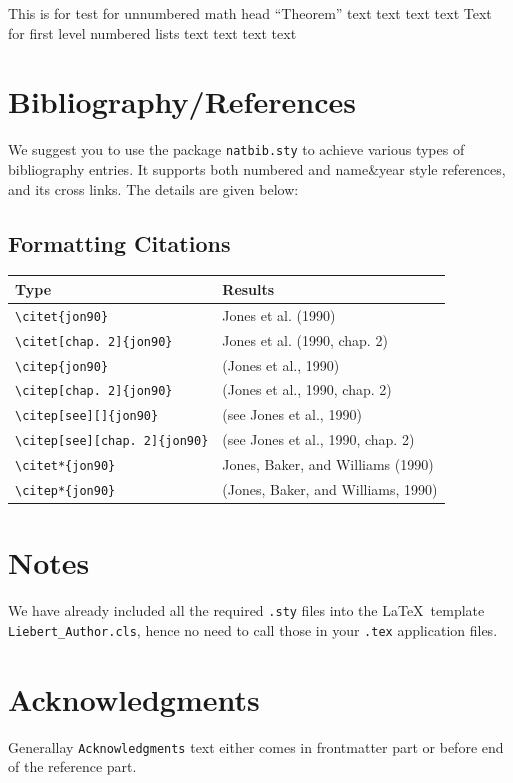 \documentclass[]{Liebert_Author}
\begin{document}
\begin{theorem*}
This is for test for unnumbered math head ``Theorem'' text text text text
Text for first level numbered lists text text text text 
\end{theorem*}

\section{Bibliography/References}

We suggest you to use the package \verb!natbib.sty! to achieve various types of bibliography entries. It supports both numbered and name\&year style references, and its cross links. The details are given below:

\subsection{Formatting Citations}

\noindent\begin{tabular}{@{}ll}
\bf Type&\bf Results\\
\midrule
\verb+\citet{jon90}+&Jones et al. (1990)\\
\verb+\citet[chap. 2]{jon90}+&Jones et al. (1990, chap. 2)\\
    \verb+\citep{jon90}+	    &   	(Jones et al., 1990)\\
    \verb+\citep[chap. 2]{jon90}+ 	&    	(Jones et al., 1990, chap. 2)\\
    \verb+\citep[see][]{jon90}+ 	 &    	(see Jones et al., 1990)\\
    \verb+\citep[see][chap. 2]{jon90}+ 	&    	(see Jones et al., 1990, chap. 2)\\
    \verb+\citet*{jon90}+ 	    &    	Jones, Baker, and Williams (1990)\\
    \verb+\citep*{jon90}+	    &    	(Jones, Baker, and Williams,
    1990) \\
\end{tabular}

\section{Notes}

We have already included all the required \texttt{.sty} files into the
\LaTeX\ template \verb!Liebert_Author.cls!, hence no need to call those in
your \texttt{.tex} application files.

\section*{Acknowledgments}
Generallay \verb!Acknowledgments! text either comes in frontmatter
part or before end of the reference part.
\end{document}
